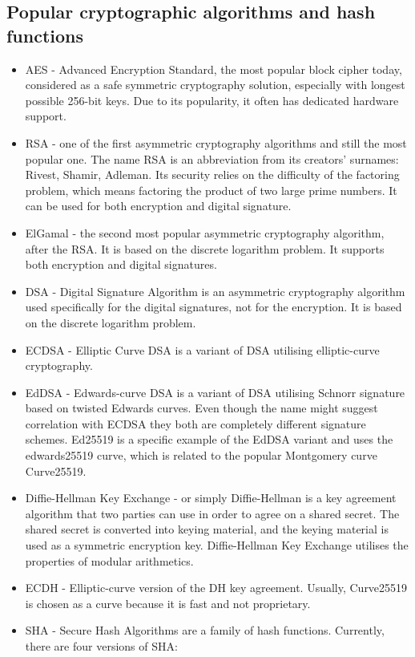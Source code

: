 \subsection{Popular cryptographic algorithms and hash functions}
\begin{itemize}
    \item AES - Advanced Encryption Standard, the most popular block cipher today, considered as a safe symmetric cryptography solution, especially with longest possible 256-bit keys. Due to its popularity, it often has dedicated hardware support.
    \item RSA - one of the first asymmetric cryptography algorithms and still the most popular one. The name RSA is an abbreviation from its creators' surnames: Rivest, Shamir, Adleman. Its security relies on the difficulty of the factoring problem, which means factoring the product of two large prime numbers. It can be used for both encryption and digital signature.
    \item ElGamal - the second most popular asymmetric cryptography algorithm, after the RSA. It is based on the discrete logarithm problem. It supports both encryption and digital signatures.
    \item DSA - Digital Signature Algorithm is an asymmetric cryptography algorithm used specifically for the digital signatures, not for the encryption. It is based on the discrete logarithm problem.
    \item ECDSA - Elliptic Curve DSA is a variant of DSA utilising elliptic-curve cryptography.
    \item EdDSA - Edwards-curve DSA is a variant of DSA utilising Schnorr signature based on twisted Edwards curves. Even though the name might suggest correlation with ECDSA they both are completely different signature schemes. Ed25519 is a specific example of the EdDSA variant and uses the edwards25519 curve, which is related to the popular Montgomery curve Curve25519. 
    \item Diffie-Hellman Key Exchange - or simply Diffie-Hellman is a key agreement algorithm that two parties can use in order to agree on a shared secret. The shared secret is converted into keying material, and the keying material is used as a symmetric encryption key. Diffie-Hellman Key Exchange utilises the properties of modular arithmetics.
    \item ECDH - Elliptic-curve version of the DH key agreement. Usually, Curve25519 is chosen as a curve because it is fast and not proprietary.
    \item SHA - Secure Hash Algorithms are a family of hash functions. Currently, there are four versions of SHA: \begin{enumerate}

\end{enumerate}
\end{itemize}
